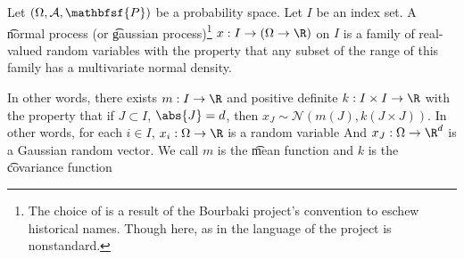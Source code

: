

Let $(\Omega, \mathcal{A}, \mathbfsf{P})$ be a probability space.
Let $I$ be an index set.
A \t{normal process} (or \t{gaussian process})\footnote{The choice of  is a result of the Bourbaki project's convention to eschew historical names. Though here, as in  the language of the project is nonstandard.} $x: I \to (\Omega \to \R)$ on $I$ is a family of real-valued random variables with the property that any subset of the range of this family has a multivariate normal density.

In other words, there exists $m: I \to \R$ and positive definite $k: I \times I \to \R$ with the property that if $J \subset I$, $\abs{J} = d$, then $x_J \sim \mathcal{N}(m(J), k(J \times J))$.
In other words, for each $i \in I$, $x_i: \Omega \to \R$ is a random variable
And $x_J: \Omega \to \R^d$ is a Gaussian random vector.
We call $m$ is the \t{mean function} and $k$ is the \t{covariance function}

\blankpage
